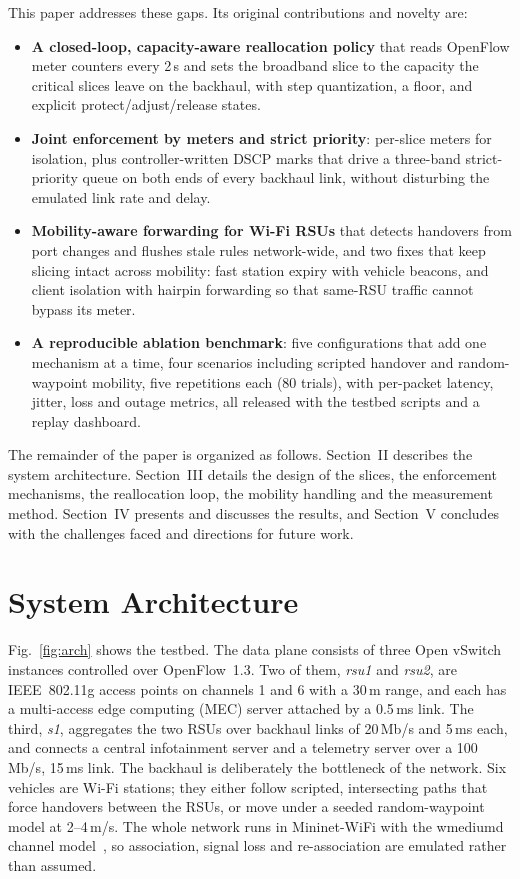\documentclass[conference]{IEEEtran}
\begin{document}
This paper addresses these gaps. Its original contributions and novelty are:
\begin{itemize}
\item \textbf{A closed-loop, capacity-aware reallocation policy} that reads OpenFlow meter counters every 2\,s and sets the broadband slice to the capacity the critical slices leave on the backhaul, with step quantization, a floor, and explicit protect/adjust/release states.
\item \textbf{Joint enforcement by meters and strict priority}: per-slice meters for isolation, plus controller-written DSCP marks that drive a three-band strict-priority queue on both ends of every backhaul link, without disturbing the emulated link rate and delay.
\item \textbf{Mobility-aware forwarding for Wi-Fi RSUs} that detects handovers from port changes and flushes stale rules network-wide, and two fixes that keep slicing intact across mobility: fast station expiry with vehicle beacons, and client isolation with hairpin forwarding so that same-RSU traffic cannot bypass its meter.
\item \textbf{A reproducible ablation benchmark}: five configurations that add one mechanism at a time, four scenarios including scripted handover and random-waypoint mobility, five repetitions each (80 trials), with per-packet latency, jitter, loss and outage metrics, all released with the testbed scripts and a replay dashboard.
\end{itemize}

The remainder of the paper is organized as follows. Section~II describes the system architecture. Section~III details the design of the slices, the enforcement mechanisms, the reallocation loop, the mobility handling and the measurement method. Section~IV presents and discusses the results, and Section~V concludes with the challenges faced and directions for future work.

\section{System Architecture}

Fig.~\ref{fig:arch} shows the testbed. The data plane consists of three Open vSwitch instances controlled over OpenFlow~1.3. Two of them, \emph{rsu1} and \emph{rsu2}, are IEEE~802.11g access points on channels 1 and 6 with a 30\,m range, and each has a multi-access edge computing (MEC) server attached by a 0.5\,ms link. The third, \emph{s1}, aggregates the two RSUs over backhaul links of 20\,Mb/s and 5\,ms each, and connects a central infotainment server and a telemetry server over a 100\,Mb/s, 15\,ms link. The backhaul is deliberately the bottleneck of the network. Six vehicles are Wi-Fi stations; they either follow scripted, intersecting paths that force handovers between the RSUs, or move under a seeded random-waypoint model at 2--4\,m/s. The whole network runs in Mininet-WiFi with the wmediumd channel model~\cite{fontes2015mininetwifi}, so association, signal loss and re-association are emulated rather than assumed.
\end{document}

